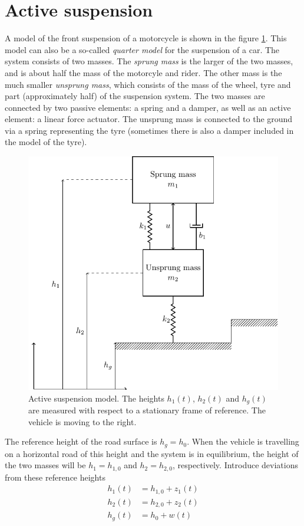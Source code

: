 \documentclass[a4paper]{scrartcl}
\begin{document}
\section*{Active suspension}
\label{sec-2}
A model of the front suspension of a motorcycle is shown in the figure \ref{fig:quarter}. This model can also be a so-called \emph{quarter model} for the suspension of a car.  The system consists of two masses. The \emph{sprung mass} is the larger of the two masses, and is about half the mass of the motorcyle and rider. The other mass is the much smaller \emph{unsprung mass}, which consists of the mass of the wheel, tyre and part (approximately half) of the suspension system. The two masses are connected by two passive elements: a spring and a damper, as well as an active element: a linear force actuator. The unsprung mass is connected to the ground via a spring representing the tyre (sometimes there is also a damper included in the model of the tyre).
\begin{figure}
\begin{center}
\includegraphics[width=0.65\linewidth]{../figures/active-suspension-nodamper}
\caption{Active suspension model. The heights $h_1(t)$, $h_2(t)$ and $h_g(t)$ are measured with respect to a stationary frame of reference. The vehicle is moving to the right.}
\label{fig:quarter}
\end{center}
\end{figure}

The reference height of the road surface is $h_g = h_0$. When the vehicle is travelling on a horizontal road of this height and the system is in equilibrium, the height of the two masses will be $h_1=h_{1,0}$ and $h_2 = h_{2,0}$, respectively. Introduce deviations from these reference heights
\begin{align*}
h_1(t) &= h_{1,0} + z_1(t)\\
h_2(t) &= h_{2,0} + z_2(t)\\
h_g(t) &= h_{0} + w(t)
\end{align*}
\end{document}
